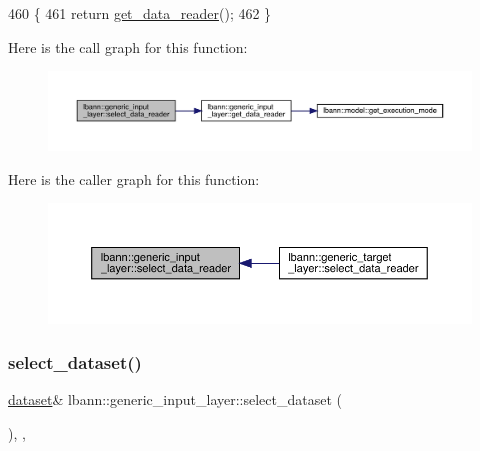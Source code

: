 \begin{DoxyCode}
460                                                            \{
461     \textcolor{keywordflow}{return} \hyperlink{classlbann_1_1generic__input__layer_aba732becdb02627e3ad4493ac19e8fb6}{get\_data\_reader}();
462   \}
\end{DoxyCode}
Here is the call graph for this function\+:\nopagebreak
\begin{figure}[H]
\begin{center}
\leavevmode
\includegraphics[width=350pt]{classlbann_1_1generic__input__layer_a9783805369ec7cfe5ce61c81baa5d2e2_cgraph}
\end{center}
\end{figure}
Here is the caller graph for this function\+:\nopagebreak
\begin{figure}[H]
\begin{center}
\leavevmode
\includegraphics[width=350pt]{classlbann_1_1generic__input__layer_a9783805369ec7cfe5ce61c81baa5d2e2_icgraph}
\end{center}
\end{figure}
\mbox{\label{classlbann_1_1generic__input__layer_a654365ee97a64c75a547cfb7ef329304}} 
\subsubsection{\texorpdfstring{select\+\_\+dataset()}{select\_dataset()}\hspace{0.1cm}{\footnotesize\ttfamily [1/2]}}
{\footnotesize\ttfamily \hyperlink{classlbann_1_1dataset}{dataset}\& lbann\+::generic\+\_\+input\+\_\+layer\+::select\+\_\+dataset (\begin{DoxyParamCaption}{ }\end{DoxyParamCaption})\hspace{0.3cm}{\ttfamily [inline]}, {\ttfamily [override]}, {\ttfamily [virtual]}}

